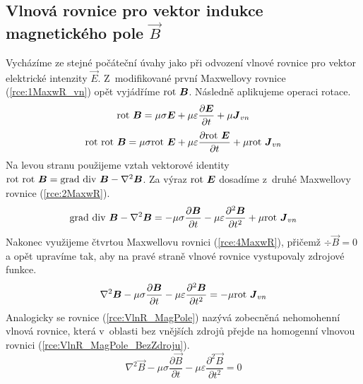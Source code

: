 \subsection{Vlnová rovnice pro vektor indukce magnetického pole $\vec B$}
Vycházíme ze stejné počáteční úvahy jako při odvození vlnové rovnice pro vektor elektrické intenzity $\vec E$. Z~modifikované první Maxwellovy rovnice (\ref{rce:1MaxwR_vn}) opět vyjádříme $\mathrm{rot}\  \mbox{\boldmath$B$}$. Následně aplikujeme operaci rotace.
\begin{displaymath}
	\mathrm{rot}\ \mbox{\boldmath$B$} = \mu\sigma\mbox{\boldmath$E$}+\mu\varepsilon\frac{\partial\mbox{\boldmath$E$}}{\partial t}+\mu\mbox{\boldmath$J$}_{vn}
\end{displaymath}
\begin{displaymath}
	\mathrm{rot}\ \mathrm{rot}\ \mbox{\boldmath$B$} = \mu\sigma\mathrm{rot}\ \mbox{\boldmath$E$}+\mu\varepsilon\frac{\partial \mathrm{rot}\ \mbox{\boldmath$E$}}{\partial t}+\mu\mathrm{rot}\ \mbox{\boldmath$J$}_{vn}
\end{displaymath}
Na levou stranu použijeme vztah vektorové identity $\mathrm{rot}\ \mathrm{rot}\ \mbox{\boldmath$B$} = \mathrm{grad}\ \mathrm{div}\ \mbox{\boldmath$B$} - \nabla^{2}\mbox{\boldmath$B$}$. Za výraz $\mathrm{rot}\  \mbox{\boldmath$E$}$ dosadíme z~druhé Maxwellovy rovnice (\ref{rce:2MaxwR}). 
\begin{displaymath}
	\mathrm{grad}\ \mathrm{div}\ \mbox{\boldmath$B$} - \nabla^{2}\mbox{\boldmath$B$} = -\mu\sigma\frac{\partial\mbox{\boldmath$B$}}{\partial t}-\mu\varepsilon\frac{\partial^{2}\mbox{\boldmath$B$}}{\partial t^{2}}+\mu\mathrm{rot}\ \mbox{\boldmath$J$}_{vn}
\end{displaymath}
Nakonec využijeme čtvrtou Maxwellovu rovnici (\ref{rce:4MaxwR}), přičemž $\div \vec B = 0$ a opět upravíme tak, aby na pravé straně vlnové rovnice vystupovaly zdrojové funkce.
\begin{equation}
	\nabla^{2}\mbox{\boldmath$B$} -\mu\sigma\frac{\partial\mbox{\boldmath$B$}}{\partial t}-\mu\varepsilon\frac{\partial^{2}\mbox{\boldmath$B$}}{\partial t^{2}}= -\mu\mathrm{rot}\ \mbox{\boldmath$J$}_{vn}
	\label{rce:VlnR_MagPole}
\end{equation}
Analogicky se rovnice (\ref{rce:VlnR_MagPole}) nazývá zobecněná nehomohenní vlnová rovnice, která v~oblasti bez vnějších zdrojů přejde na homogenní vlnovou rovnici (\ref{rce:VlnR_MagPole_BezZdroju}).
\begin{equation}
	\nabla^{2}\vec B -\mu\sigma\frac{\partial\vec B}{\partial t}-\mu\varepsilon\frac{\partial^{2}\vec B}{\partial t^{2}}= 0
	\label{rce:VlnR_MagPole_BezZdroju}
\end{equation}

